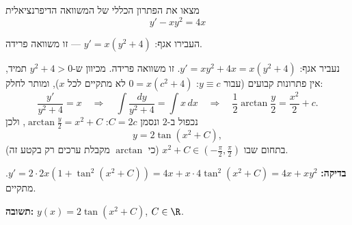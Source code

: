
\begin{question}
מצאו את הפתרון הכללי של המשוואה הדיפרנציאלית
\[ y' - xy^2 = 4x \]
\end{question}

\begin{hint}
העבירו אגף: $y' = x(y^2 + 4)$ — זו משוואה פרידה.
\end{hint}

\begin{solution}
נעביר אגף: $y' = xy^2 + 4x = x(y^2 + 4)$. זו משוואה פרידה. מכיוון ש-$y^2 + 4 > 0$ תמיד, אין פתרונות קבועים (עבור $y\equiv c$: $0 = x(c^2+4)$ לא מתקיים לכל $x$), ומותר לחלק:
\[ \frac{y'}{y^2 + 4} = x \quad\Longrightarrow\quad \int\frac{dy}{y^2 + 4} = \int x\,dx \quad\Longrightarrow\quad \frac12\arctan\frac y2 = \frac{x^2}{2} + c. \]
נכפול ב-$2$ ונסמן $C = 2c$: $\arctan\frac y2 = x^2 + C$, ולכן
\[ y = 2\tan\left(x^2 + C\right), \]
בתחום שבו $x^2 + C \in (-\frac\pi2, \frac\pi2)$ (כי $\arctan$ מקבלת ערכים רק בקטע זה).

\textbf{בדיקה:} $y' = 2\cdot 2x\left(1 + \tan^2(x^2 + C)\right) = 4x + x\cdot 4\tan^2(x^2+C) = 4x + xy^2$. מתקיים.

\textbf{תשובה:} $y(x) = 2\tan(x^2 + C)$, $C \in \R$.
\end{solution}

